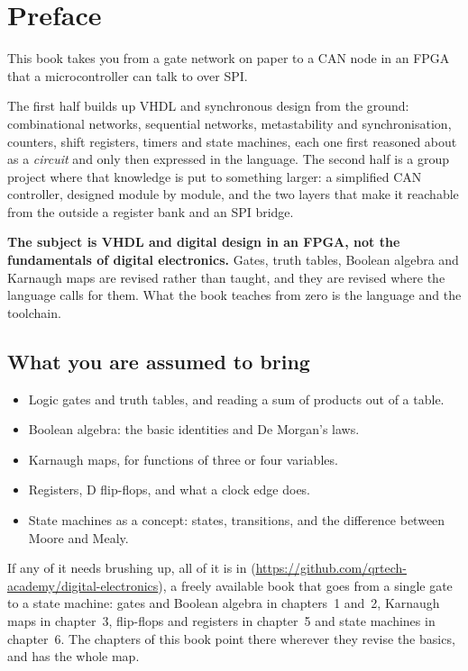 
\chapter{Preface}

This book takes you from a gate network on paper to a CAN node in an FPGA that a microcontroller
can talk to over SPI.

The first half builds up VHDL and synchronous design from the ground: combinational networks,
sequential networks, metastability and synchronisation, counters, shift registers, timers and
state machines, each one first reasoned about as a \emph{circuit} and only then expressed in the
language. The second half is a group project where that knowledge is put to something larger: a
simplified CAN controller, designed module by module, and the two layers that make it reachable
from the outside \textemdash{} a register bank and an SPI bridge.

\textbf{The subject is VHDL and digital design in an FPGA, not the fundamentals of digital
electronics.} Gates, truth tables, Boolean algebra and Karnaugh maps are revised rather than
taught, and they are revised where the language calls for them. What the book teaches from zero is
the language and the toolchain.

\section*{What you are assumed to bring}
\begin{itemize}
  \item Logic gates and truth tables, and reading a sum of products out of a table.
  \item Boolean algebra: the basic identities and De Morgan's laws.
  \item Karnaugh maps, for functions of three or four variables.
  \item Registers, D flip-flops, and what a clock edge does.
  \item State machines as a concept: states, transitions, and the difference between Moore and
    Mealy.
\end{itemize}

If any of it needs brushing up, all of it is in \debook{}
(\url{https://github.com/qrtech-academy/digital-electronics}), a freely available book that goes
from a single gate to a state machine: gates and Boolean algebra in chapters~1 and~2, Karnaugh maps
in chapter~3, flip-flops and registers in chapter~5 and state machines in chapter~6. The chapters of
this book point there wherever they revise the basics, and  has the whole
map.

